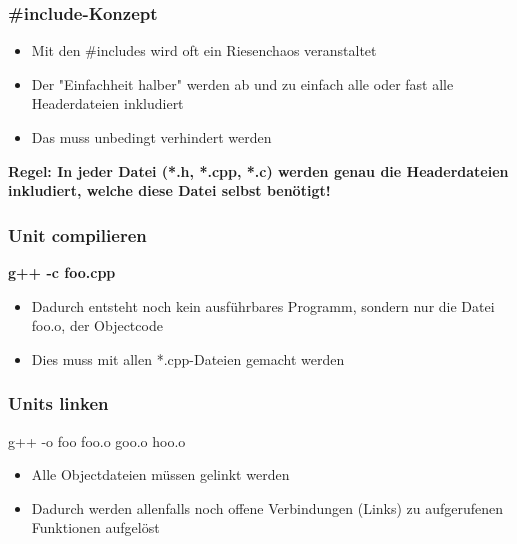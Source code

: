 \subsubsection{\#include-Konzept}
\label{sec:include-Konzept}
\begin{itemize}
	\item Mit den \#includes wird oft ein Riesenchaos veranstaltet
	\item Der "Einfachheit halber" werden ab und zu einfach alle oder fast alle Headerdateien inkludiert
	\item Das muss unbedingt verhindert werden
\end{itemize}
\textbf{Regel: In jeder Datei (*.h, *.cpp, *.c) werden genau die Headerdateien inkludiert, welche diese Datei selbst benötigt!}

\subsubsection{Unit compilieren\hfill}
\label{sec:Unit compilieren}
\begin{center}
	\textbf{g++ \color{\ownRed}-c\color{black} foo.cpp}
\end{center}
\begin{itemize}
	\item Dadurch entsteht noch kein ausführbares Programm, sondern nur die Datei foo.o, der Objectcode
	\item Dies muss mit allen *.cpp-Dateien gemacht werden
\end{itemize}

\subsubsection{Units linken\hfill}
\label{sec:Units linken}
\begin{center}
	g++ -o foo foo.o goo.o hoo.o
\end{center}
\begin{itemize}
	\item Alle Objectdateien müssen gelinkt werden
	\item Dadurch werden allenfalls noch offene Verbindungen (Links) zu aufgerufenen Funktionen aufgelöst
\end{itemize}

